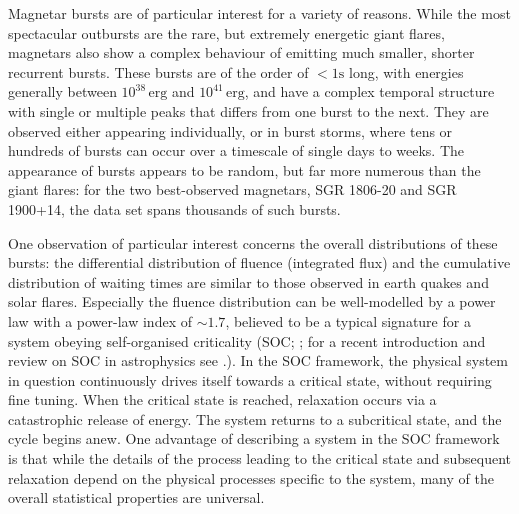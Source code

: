 \documentclass[12pt]{emulateapj}
\begin{document}
Magnetar bursts are of particular interest for a variety of reasons. While the most spectacular outbursts are the rare, but extremely energetic giant flares,
magnetars also show a complex behaviour of emitting much smaller, shorter recurrent bursts. These bursts are of the order of $<1\mathrm{s}$ long, with energies
generally between $10^{38}\,\mathrm{erg}$ and $10^{41}\,\mathrm{erg}$, and have a complex temporal structure with single or
multiple peaks that differs from one burst to the next. They are observed either appearing individually, or in burst 
storms, where tens or hundreds of bursts can occur over a timescale of single days to weeks\citep{mazets1999,goetz2006b,israel2008,mereghetti2009,savchenko2010,israel2010,scholz2011,dib2012,vanderhorst2012,vonkienlin2012}. 
The appearance of bursts appears to be random\citep{gogus1999,gogus2000}, but far more numerous than the giant flares: 
for the two best-observed magnetars, SGR 1806-20 and SGR 1900+14, the
data set spans thousands of such bursts. 

One observation of particular interest concerns the overall distributions of these bursts: the differential distribution of fluence (integrated flux) and 
the cumulative distribution of waiting times are similar to those observed in earth quakes and solar flares\citep{cheng1996}. Especially the fluence distribution
can be well-modelled by a power law with a power-law index of $\sim 1.7$, believed to be a typical signature for a system obeying 
self-organised criticality (SOC; \citealp{bak1987,bak1988}; for a recent introduction and review on SOC in astrophysics see \citealp{aschwanden2014}.). 
In the SOC framework, the physical system in question continuously drives itself towards a critical state,
without requiring fine tuning. When the critical state is reached, relaxation occurs via a catastrophic release of energy. The system returns
to a subcritical state, and the cycle begins anew. %
One advantage of describing a system in the SOC framework is that while the details of the process leading to the critical state and subsequent
relaxation depend on the physical processes specific to the system, many of the overall statistical properties are universal.
\end{document}

